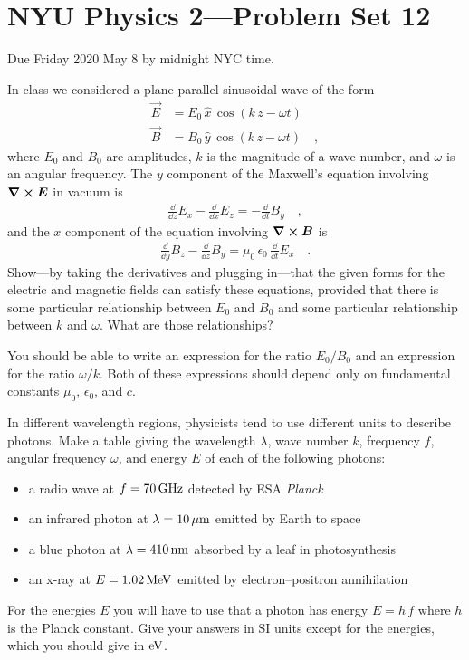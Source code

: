 \documentclass[12pt]{article}
\begin{document}
\section*{NYU Physics 2---Problem Set 12}

Due Friday 2020 May 8 by midnight NYC time.

\startproblem%
In class we considered a plane-parallel sinusoidal wave of the form
\begin{align}
  \vec{E} &= E_0\,\hat{x}\,\cos(k\,z - \omega t) \\
  \vec{B} &= B_0\,\hat{y}\,\cos(k\,z - \omega t) \quad ,
\end{align}
where $E_0$ and $B_0$ are amplitudes, $k$ is the magnitude of a
wave number, and $\omega$ is an angular frequency.
The $y$ component of the Maxwell's equation involving
$\curl{\boldsymbol{E}}$ in vacuum is
\begin{align}
  \frac{\dd}{\dd z}E_x - \frac{\dd}{\dd x}E_z = -\frac{\dd}{\dd t}B_y
  \quad ,
\end{align}
and the $x$ component of the equation involving $\curl{\boldsymbol{B}}$ is
\begin{align}
  \frac{\dd}{\dd y}B_z - \frac{\dd}{\dd z}B_y = \mu_0\,\epsilon_0\,\frac{\dd}{\dd t}E_x
  \quad .
\end{align}
Show---by taking the derivatives and plugging in---that the given forms
for the electric and magnetic fields can
satisfy these equations, provided that there is some particular relationship
between $E_0$ and $B_0$ and some particular relationship between $k$ and $\omega$.
What are those relationships?

You should be able to write an
expression for the ratio $E_0/B_0$ and an expression for the ratio $\omega/k$.
Both of these expressions should depend only on fundamental constants
$\mu_0$, $\epsilon_0$, and $c$.

\startproblem%
In different wavelength regions, physicists tend to use different
units to describe photons. Make a table giving the wavelength
$\lambda$, wave number $k$, frequency $f$, angular frequency $\omega$,
and energy $E$ of each of the following photons:
\begin{itemize}
\item a radio wave at $f=70\,\mathrm{GHz}$ detected by ESA \textsl{Planck}
\item an infrared photon at $\lambda=10\,\mathrm{\mu m}$ emitted by Earth to space
\item a blue photon at $\lambda=410\,\mathrm{nm}$ absorbed by a leaf in photosynthesis
\item an x-ray at $E=1.02\,\mathrm{MeV}$ emitted by electron--positron annihilation
\end{itemize}
For the energies $E$ you will have to use that a photon has energy $E=h\,f$
where $h$ is the Planck constant. Give your answers in SI units except for the
energies, which you should give in $\mathrm{eV}$.
\end{document}
